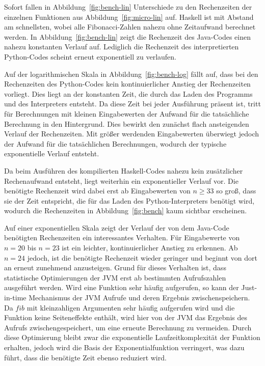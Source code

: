 \documentclass[11pt, parskip=half]{scrartcl}       %
\begin{document}
Sofort fallen in Abbildung~\ref{fig:bench-lin} Unterschiede zu den Rechenzeiten der einzelnen Funktionen aus Abbildung~\ref{fig:micro-lin} auf.
Haskell ist mit Abstand am schnellsten, wobei alle Fibonacci-Zahlen nahezu ohne Zeitaufwand berechnet werden.
In Abbildung~\ref{fig:bench-lin} zeigt die Rechenzeit des Java-Codes einen nahezu konstanten Verlauf auf.
Lediglich die Rechenzeit des interpretierten Python-Codes scheint erneut exponentiell zu verlaufen.

Auf der logarithmischen Skala in Abbildung~\ref{fig:bench-log} fällt auf, dass bei den Rechenzeiten des Python-Codes kein kontinuierlicher Anstieg der Rechenzeiten vorliegt.
Dies liegt an der konstanten Zeit, die durch das Laden des Programms und des Interpreters entsteht.
Da diese Zeit bei jeder Ausführung präsent ist, tritt für Berechnungen mit kleinen Eingabewerten der Aufwand für die tatsächliche Berechnung in den Hintergrund.
Dies bewirkt den zunächst flach ansteigenden Verlauf der Rechenzeiten.
Mit größer werdenden Eingabewerten überwiegt jedoch der Aufwand für die tatsächlichen Berechnungen, wodurch der typische exponentielle Verlauf entsteht.

Da beim Ausführen des kompilierten Haskell-Codes nahezu kein zusätzlicher Rechenaufwand entsteht, liegt weiterhin ein exponentieller Verlauf vor.
Die benötigte Rechenzeit wird dabei erst ab Eingabewerten von $n \ge 33$ so groß, dass sie der Zeit entspricht, die für das Laden des Python-Interpreters benötigt wird, wodurch die Rechenzeiten in Abbildung~\ref{fig:bench} kaum sichtbar erscheinen.

Auf einer exponentiellen Skala zeigt der Verlauf der von dem Java-Code benötigten Rechenzeiten
ein interessantes Verhalten.
Für Eingabewerte von $n = 20$ bis $n = 23$ ist ein leichter, kontinuierlicher Anstieg zu erkennen.
Ab $n = 24$ jedoch, ist die benötigte Rechenzeit wieder geringer und beginnt von dort an erneut zunehmend anzusteigen.
Grund für dieses Verhalten ist, dass statistische Optimierungen der JVM erst ab bestimmten Aufrufszahlen ausgeführt werden.
Wird eine Funktion sehr häufig aufgerufen, so kann der Just-in-time Mechanismus der JVM Aufrufe und deren Ergebnis zwischenspeichern.
Da $fib$ mit kleinzahligen Argumenten sehr häufig aufgerufen wird und die Funktion keine Seiteneffekte enthält, wird hier von der JVM das Ergebnis des Aufrufs zwischengespeichert, um eine erneute Berechnung zu vermeiden.
Durch diese Optimierung bleibt zwar die exponentielle Laufzeitkomplexität der Funktion erhalten, jedoch wird die Basis der Exponentialfunktion verringert, was dazu führt, dass die benötigte Zeit ebenso reduziert wird.
\end{document}
